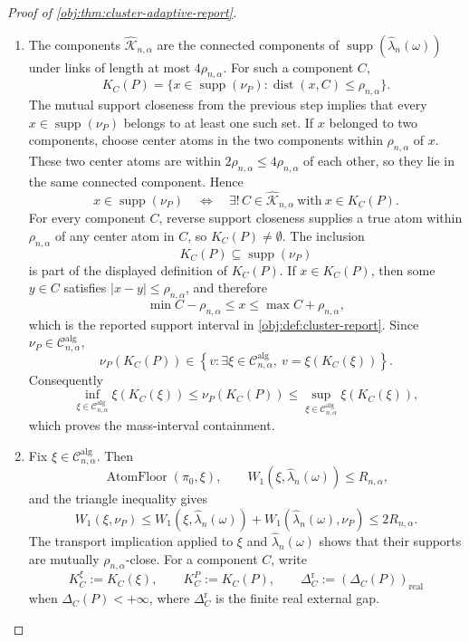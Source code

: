 \documentclass[11pt]{article}
\begin{document}
\begin{proof}[Proof of \cref{obj:thm:cluster-adaptive-report}]
\begin{enumerate}
\item The components \(\widehat{\mathscr K}_{n,\alpha}\) are the connected
components of \(\operatorname{supp}(\widehat\lambda_n(\omega))\) under links of
length at most \(4\rho_{n,\alpha}\).  For such a component \(C\),
\[
K_C(P)
=
\{x\in\operatorname{supp}(\nu_P):\operatorname{dist}(x,C)\le\rho_{n,\alpha}\}.
\]
The mutual support closeness from the previous step implies that every
\(x\in\operatorname{supp}(\nu_P)\) belongs to at least one such set.  If \(x\)
belonged to two components, choose center atoms in the two components within
\(\rho_{n,\alpha}\) of \(x\).  These two center atoms are within
\(2\rho_{n,\alpha}\le4\rho_{n,\alpha}\) of each other, so they lie in the same
connected component.  Hence
\[
x\in\operatorname{supp}(\nu_P)
\quad\Longleftrightarrow\quad
\exists!\,C\in\widehat{\mathscr K}_{n,\alpha}\ \text{with}\ x\in K_C(P).
\]
For every component \(C\), reverse support closeness supplies a true atom within
\(\rho_{n,\alpha}\) of any center atom in \(C\), so \(K_C(P)\ne\emptyset\).
The inclusion
\[
K_C(P)\subseteq\operatorname{supp}(\nu_P)
\]
is part of the displayed definition of \(K_C(P)\).  If \(x\in K_C(P)\), then
some \(y\in C\) satisfies \(|x-y|\le\rho_{n,\alpha}\), and therefore
\[
\min C-\rho_{n,\alpha}\le x\le \max C+\rho_{n,\alpha},
\]
which is the reported support interval in \cref{obj:def:cluster-report}.  Since
\(\nu_P\in\mathcal C^{\mathrm{alg}}_{n,\alpha}\),
\[
\nu_P(K_C(P))\in
\left\{v:\exists \xi\in\mathcal C^{\mathrm{alg}}_{n,\alpha},\
v=\xi(K_C(\xi))\right\}.
\]
Consequently
\[
\inf_{\xi\in\mathcal C^{\mathrm{alg}}_{n,\alpha}}\xi(K_C(\xi))
\le
\nu_P(K_C(P))
\le
\sup_{\xi\in\mathcal C^{\mathrm{alg}}_{n,\alpha}}\xi(K_C(\xi)),
\]
which proves the mass-interval containment. %

\item Fix \(\xi\in\mathcal C^{\mathrm{alg}}_{n,\alpha}\).  Then
\[
\operatorname{AtomFloor}(\pi_0,\xi),
\qquad
W_1(\xi,\widehat\lambda_n(\omega))\le R_{n,\alpha},
\]
and the triangle inequality gives
\[
W_1(\xi,\nu_P)
\le
W_1(\xi,\widehat\lambda_n(\omega))
+
W_1(\widehat\lambda_n(\omega),\nu_P)
\le 2R_{n,\alpha}.
\]
The transport implication applied to \(\xi\) and \(\widehat\lambda_n(\omega)\)
shows that their supports are mutually \(\rho_{n,\alpha}\)-close.  For a
component \(C\), write
\[
K_C^\xi:=K_C(\xi),
\qquad
K_C^P:=K_C(P),
\qquad
\Delta_C^{\mathrm r}:=(\Delta_C(P))_{\mathrm{real}}
\]
when \(\Delta_C(P)<+\infty\), where \(\Delta_C^{\mathrm r}\) is the finite real
external gap.


\end{enumerate}
\end{proof}
\end{document}
